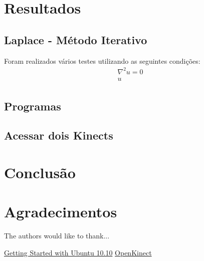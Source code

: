 \documentclass[journal]{IEEEtran}
\begin{document}
\section{Resultados}
\subsection{Laplace - Método Iterativo}
Foram realizados vários testes utilizando as seguintes condições:
\begin{eqnarray}
\nabla^2 u=0\\
u_{}
\end{eqnarray}
\newpage
\subsection{Programas\label{exemplos}}
\newpage

\subsection{Acessar dois Kinects}


\section{Conclusão}

\section*{Agradecimentos}


The authors would like to thank...

\begin{thebibliography}{4}
  
 \href{ftp://ftp.fisio.cinvestav.mx/Manuales/linux/Getting\%20Started\%20with\%20Ubuntu\%2010.10.pdf}{Getting Started with Ubuntu 10.10}
 \href{http://openkinect.org/wiki/Main_Page}{OpenKinect}
\end{thebibliography}
\end{document}
